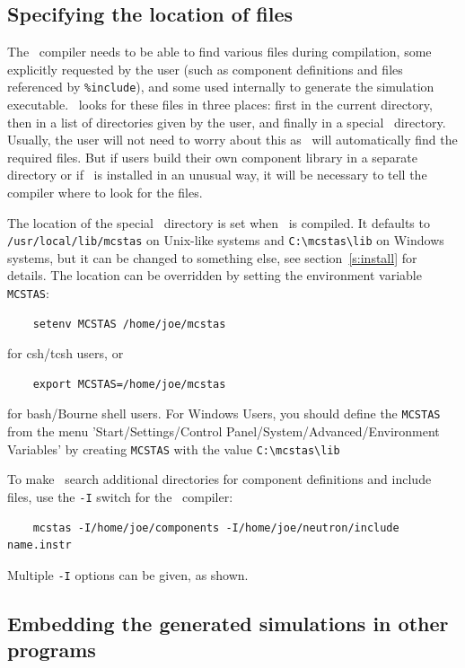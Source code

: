 \subsection{Specifying the location of files}
\label{s:files}

The \MCS\ compiler needs to be able to find various files during
compilation, some explicitly requested by the user (such as component
definitions and files referenced by \verb+%include+), 
and some used internally to generate the simulation executable. \MCS\ looks for these
files in three places: first in the current directory, then in a list of
directories given by the user, and finally in a special \MCS\
directory. Usually, the user will not need to worry about this as \MCS\
will automatically find the required files. But if users build their own
component library in a separate directory or if \MCS\ is installed in an
unusual way, it will be necessary to tell the compiler where to look
for the files.

The location of the special \MCS\ directory is set when \MCS\ is
compiled. It defaults to \verb+/usr/local/lib/mcstas+ on Unix-like systems and \verb+C:\mcstas\lib+ on Windows systems, but it can be
changed to something else, see section~\ref{s:install} for
details. The location can be overridden by setting the environment
variable \verb+MCSTAS+: \index{Environment variable!MCSTAS}
\begin{verbatim}
    setenv MCSTAS /home/joe/mcstas
\end{verbatim}
for csh/tcsh users, or
\begin{verbatim}
    export MCSTAS=/home/joe/mcstas
\end{verbatim}
for bash/Bourne shell users.
For Windows Users, you should define the \verb+MCSTAS+ from the menu 'Start/Settings/Control Panel/System/Advanced/Environment
Variables' by creating \verb+MCSTAS+ with the value \verb+C:\mcstas\lib+

To make \MCS\ search additional directories for component definitions
and include files, use the \verb+-I+ switch for the \MCS\ compiler:
\begin{verbatim}
    mcstas -I/home/joe/components -I/home/joe/neutron/include name.instr
\end{verbatim}
Multiple \verb+-I+ options can be given, as shown.


\subsection{Embedding the generated simulations in other programs}

